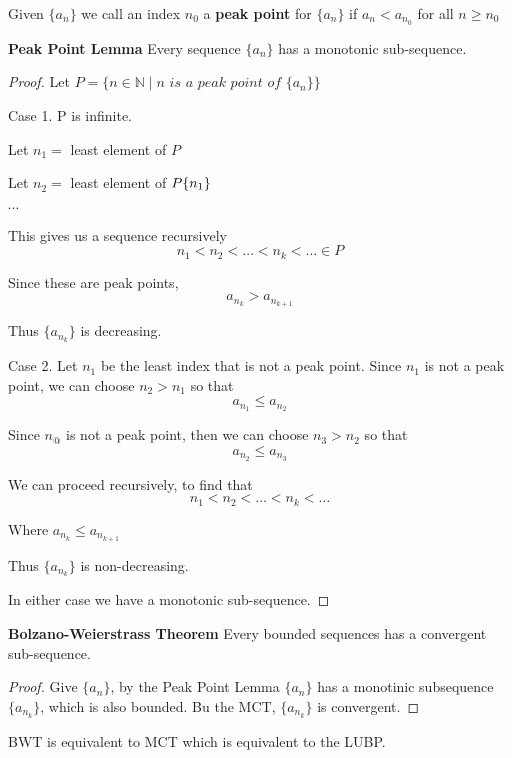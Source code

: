 \begin{defn}
Given $\{a_n\}$ we call an index $n_0$ a \textbf{peak point} for $\{a_n\}$ if $a_n < a_{n_0}$ for all $n\geq n_0$
\end{defn}

\begin{lem} \textbf{Peak Point Lemma}
Every sequence $\{a_n\}$ has a monotonic sub-sequence.
\end{lem}

\begin{proof}
Let $P = \{n \in\mathbb{N} \mid \textit{n is a peak point of } \{a_n\}\}$ 

Case 1. P is infinite.

Let $n_1 = $ least element of $P$

Let $n_2 = $ least element of $P \\ \{n_1\}$

$\cdots$

This gives us a sequence recursively
\[n_1<n_2<\dots < n_k < \dots \in P\]

Since these are peak points, 
\[a_{n_k} > a_{n_{k+1}}\]

Thus $\{a_{n_k}\}$ is decreasing.

Case 2. Let $n_1$ be the least index that is not a peak point. Since $n_1$ is not a peak point, we can choose $n_2>n_1$ so that $$a_{n_1}\leq a_{n_2}$$

Since $n_@$ is not a peak point, then we can choose $n_3>n_2$ so that $$a_{n_2}\leq a_{n_3}$$

We can proceed recursively, to find that 
\[
n_1 < n_2 < \dots < n_k < \dots
\]

Where $a_{n_k}\leq a_{n_{k+1}}$

Thus $\{a_{n_k}\}$ is non-decreasing.

In either case we have a monotonic sub-sequence.
\end{proof}


\begin{thm} \textbf{Bolzano-Weierstrass Theorem}
Every bounded sequences has a convergent sub-sequence.
\end{thm}

\begin{proof}
Give $\{a_n\}$, by the Peak Point Lemma $\{a_n\}$ has a monotinic subsequence $\{a_{n_k}\}$, which is also bounded. Bu the MCT, $\{a_{n_k}\}$ is convergent.
\end{proof}

\begin{note}
BWT is equivalent to MCT which is equivalent to the LUBP.
\end{note}



